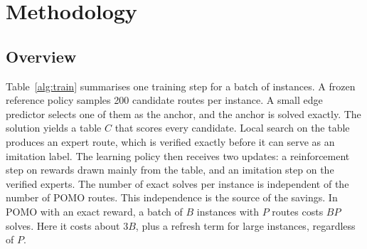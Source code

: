 \documentclass[preprint,12pt,authoryear]{elsarticle}
\begin{document}
\section{Methodology}
\label{sec:method}

\subsection{Overview}

Table~\ref{alg:train} summarises one training step for a batch of instances. A frozen reference policy samples 200 candidate routes per instance. A small edge predictor selects one of them as the anchor, and the anchor is solved exactly. The solution yields a table $C$ that scores every candidate. Local search on the table produces an expert route, which is verified exactly before it can serve as an imitation label. The learning policy then receives two updates: a reinforcement step on rewards drawn mainly from the table, and an imitation step on the verified experts. The number of exact solves per instance is independent of the number of POMO routes. This independence is the source of the savings. In POMO with an exact reward, a batch of $B$ instances with $P$ routes costs $BP$ solves. Here it costs about $3B$, plus a refresh term for large instances, regardless of $P$.
\end{document}
